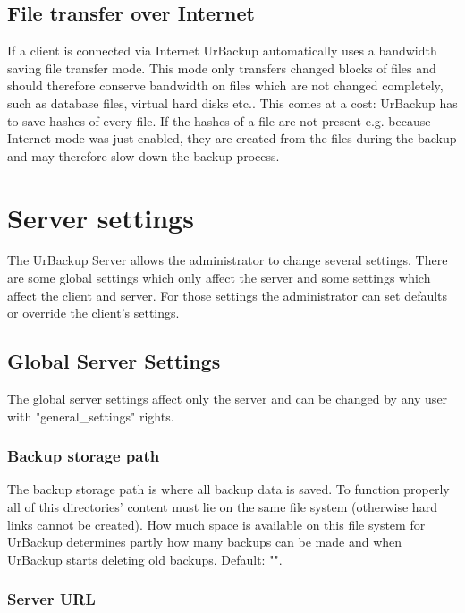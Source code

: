 \documentclass[a4paper,10pt]{article}
\begin{document}
\subsection{File transfer over Internet}

If a client is connected via Internet UrBackup automatically uses a bandwidth saving
file transfer mode. This mode only transfers changed blocks of files and should 
therefore conserve bandwidth on files which are not changed completely, such as
database files, virtual hard disks etc.. This comes at a cost: UrBackup has to save
hashes of every file. If the hashes of a file are not present e.g.
because Internet mode was just enabled, they are created from the files during
the backup and may therefore slow down the backup process. 

\section{Server settings}
\label{server_settings}

The UrBackup Server allows the administrator to change several settings. There
are some global settings which only affect the server and some settings which
affect the client and server. For those settings the administrator can set
defaults or override the client's settings.

\subsection{Global Server Settings}

The global server settings affect only the server and can be changed by any user
with "general\_settings" rights.

\subsubsection{Backup storage path}

The backup storage path is where all backup data is saved. To function properly all of this directories' content must lie on the same file system (otherwise hard links cannot be created). How much space is available on this file system for UrBackup determines partly how many backups can be made and when UrBackup starts deleting old backups. Default: "".

\subsubsection{Server URL}
\end{document}
